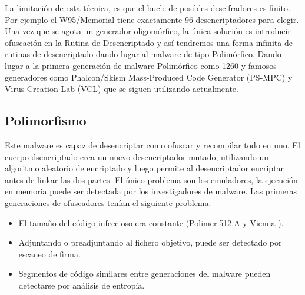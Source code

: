 \documentclass[15pt]{article}
\begin{document}
	La limitación de esta técnica, es que el bucle de posibles descifradores es finito. Por ejemplo el W95/Memorial \cite{memorial} tiene exactamente 96 desencriptadores para elegir. Una vez que se agota un generador oligomórfico, la única solución es introducir ofuscación en la Rutina de Desencriptado y así tendremos una forma infinita de rutinas de desencriptado dando lugar al malware de tipo Polimórfico. Dando lugar a la primera generación de malware Polimórfico como 1260 \cite{1260} y famosos generadores como Phalcon/Skism Mass-Produced Code Generator (PS-MPC) \cite{psmpc} y Virus Creation Lab (VCL)\cite{vcl} que se siguen utilizando actualmente.
	
	\subsection{Polimorfismo}
	Este malware es capaz de desencriptar como ofuscar y recompilar todo en uno. El cuerpo dsencriptado crea un nuevo desencriptador mutado, utilizando un algoritmo aleatorio de encriptado y luego permite al desencriptador encriptar antes de linkar las dos partes. El único problema son los emuladores, la ejecución en memoria puede ser detectada por los investigadores de malware.
	Las primeras generaciones de ofuscadores tenían el siguiente problema:
	\begin{itemize}
		\item El tamaño del código infeccioso era constante (Polimer.512.A y Vienna \cite{vienna}).
		\item Adjuntando o preadjuntando al fichero objetivo, puede ser detectado por escaneo de firma.
		\item Segmentos de código similares entre generaciones del malware pueden detectarse por análisis de entropía.
	\end{itemize}
\end{document}
